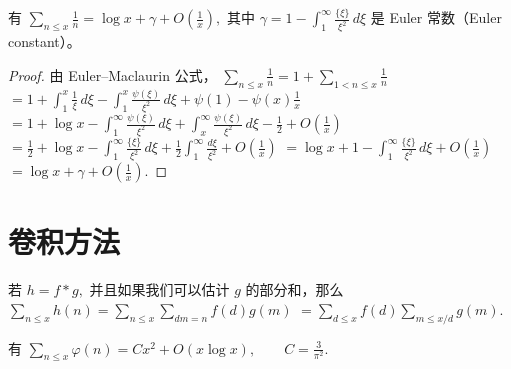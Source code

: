 \begin{corollary}[原文 Corollary 1]
	有
	\(\textstyle \sum_{n\leq\allowbreak{} x}\frac1n =\allowbreak{} \log x+\allowbreak{}\gamma+\allowbreak{}O\left(\frac1x\right),\allowbreak{}\)
	其中
	\(\textstyle \gamma =\allowbreak{} 1-\int_1^\infty\frac{\{\xi\}}{\xi^2}\,d\xi\)
	是 Euler 常数（Euler constant）。
\end{corollary}

\begin{proof}
	由 Euler--Maclaurin 公式，
	\(\textstyle \sum_{n\leq\allowbreak{} x}\frac1n =\allowbreak{} 1+\allowbreak{}\sum_{1<n\leq\allowbreak{} x}\frac1n\) \(\textstyle =\allowbreak{} 1+\allowbreak{}\int_1^x\frac1\xi\,d\xi -\int_1^x\frac{\psi(\xi)}{\xi^2}\,d\xi +\allowbreak{}\psi(1)-\psi(x)\frac1x\) \(\textstyle =\allowbreak{} 1+\allowbreak{}\log x-\int_1^\infty\frac{\psi(\xi)}{\xi^2}\,d\xi +\allowbreak{}\int_x^\infty\frac{\psi(\xi)}{\xi^2}\,d\xi -\frac12+\allowbreak{}O\left(\frac1x\right)\) \(\textstyle =\allowbreak{} \frac12+\allowbreak{}\log x -\int_1^\infty\frac{\{\xi\}}{\xi^2}\,d\xi +\allowbreak{}\frac12\int_1^\infty\frac{d\xi}{\xi^2} +\allowbreak{}O\left(\frac1x\right)\) \(\textstyle =\allowbreak{} \log x+\allowbreak{}1-\int_1^\infty\frac{\{\xi\}}{\xi^2}\,d\xi +\allowbreak{}O\left(\frac1x\right)\) \(\textstyle =\allowbreak{} \log x+\allowbreak{}\gamma+\allowbreak{}O\left(\frac1x\right).\)
\end{proof}



\section{卷积方法}


若
\(\textstyle h=\allowbreak{}f*g,\allowbreak{}\)
并且如果我们可以估计 $g$ 的部分和，那么
\(\textstyle \sum_{n\leq\allowbreak{} x}h(n) =\allowbreak{} \sum_{n\leq\allowbreak{} x}\sum_{dm=\allowbreak{}n}f(d)g(m)\) \(\textstyle =\allowbreak{} \sum_{d\leq\allowbreak{} x}f(d)\sum_{m\leq\allowbreak{} x/d}g(m).\)

\begin{theorem}[原文 Theorem 3]
	有
	\(\textstyle \sum_{n\leq\allowbreak{} x}\varphi(n) =\allowbreak{} Cx^2+\allowbreak{}O(x\log x),\allowbreak{} \qquad C=\allowbreak{}\frac{3}{\pi^2}.\)
\end{theorem}

